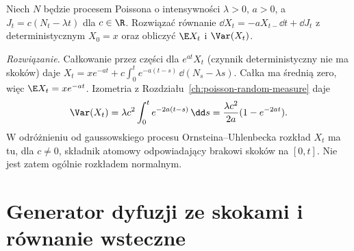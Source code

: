 \begin{zadanie}
Niech $N$ będzie procesem Poissona o intensywności
$\lambda>0$, $a>0$, a $J_t=c(N_t-\lambda t)$ dla
$c\in\R$. Rozwiązać równanie
$\dd X_t=-aX_{t-}\dd t+\dd J_t$ z deterministycznym
$X_0=x$ oraz obliczyć $\E X_t$ i $\Var(X_t)$.

\emph{Rozwiązanie.} Całkowanie przez części dla
$e^{at}X_t$ (czynnik deterministyczny nie ma skoków)
daje
$X_t=xe^{-at}+c\int_0^te^{-a(t-s)}\,\dd(N_s-\lambda s)$.
Całka ma średnią zero, więc $\E X_t=xe^{-at}$.
Izometria z Rozdziału~\ref{ch:poisson-random-measure} daje
\[
\Var(X_t)=\lambda c^2\int_0^t e^{-2a(t-s)}\,\dd s
=\frac{\lambda c^2}{2a}(1-e^{-2at}).
\]
W odróżnieniu od gaussowskiego procesu
Ornsteina--Uhlenbecka rozkład $X_t$ ma tu, dla
$c\ne0$, składnik atomowy odpowiadający brakowi skoków
na $[0,t]$. Nie jest zatem ogólnie rozkładem normalnym.
\end{zadanie}

\section{Generator dyfuzji ze skokami i równanie wsteczne}


